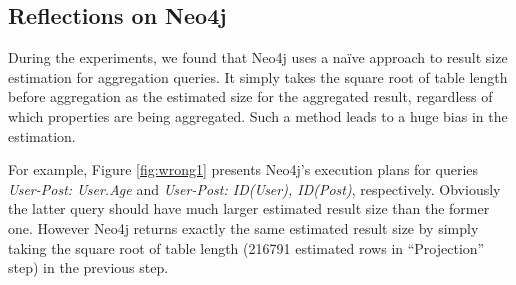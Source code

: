 \subsection{Reflections on Neo4j}
During the experiments, we found that Neo4j uses a na\"ive approach to result size estimation for aggregation queries. It simply takes the square root of table length before aggregation as the estimated size for the aggregated result, regardless of which properties are being aggregated. Such a method leads to a huge bias in the estimation.

For example, Figure \ref{fig:wrong1} presents Neo4j's execution plans for queries \textit{User-Post: User.Age} and \textit{User-Post: ID(User), ID(Post)}, respectively. Obviously the latter query should have much larger estimated result size than the former one. However Neo4j returns exactly the same estimated result size by simply taking the square root of table length (216791 estimated rows in ``Projection'' step) in the previous step.


